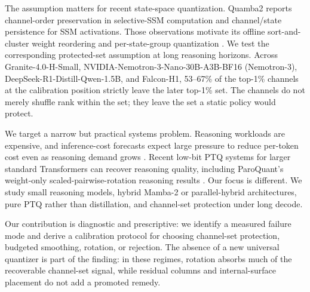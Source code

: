 \documentclass{article}
\begin{document}
The assumption matters for recent state-space quantization. Quamba2 reports channel-order preservation in selective-SSM computation and channel/state persistence for SSM activations. Those observations motivate its offline sort-and-cluster weight reordering and per-state-group quantization \citep{chiang2025quamba2}. We test the corresponding protected-set assumption at long reasoning horizons. Across Granite-4.0-H-Small, NVIDIA-Nemotron-3-Nano-30B-A3B-BF16 (Nemotron-3), DeepSeek-R1-Distill-Qwen-1.5B, and Falcon-H1, 53--67\% of the top-1\% channels at the calibration position strictly leave the later top-1\% set. The channels do not merely shuffle rank within the set; they leave the set a static policy would protect.

We target a narrow but practical systems problem. Reasoning workloads are expensive, and inference-cost forecasts expect large pressure to reduce per-token cost even as reasoning demand grows \citep{wiggers2025reasoningcosts,gartner2026inferencecost}. Recent low-bit PTQ systems for larger standard Transformers can recover reasoning quality, including ParoQuant's weight-only scaled-pairwise-rotation reasoning results \citep{liang2026paroquant}. Our focus is different. We study small reasoning models, hybrid Mamba-2 or parallel-hybrid architectures, pure PTQ rather than distillation, and channel-set protection under long decode.

Our contribution is diagnostic and prescriptive: we identify a measured failure mode and derive a calibration protocol for choosing channel-set protection, budgeted smoothing, rotation, or rejection. The absence of a new universal quantizer is part of the finding: in these regimes, rotation absorbs much of the recoverable channel-set signal, while residual columns and internal-surface placement do not add a promoted remedy.
\end{document}
